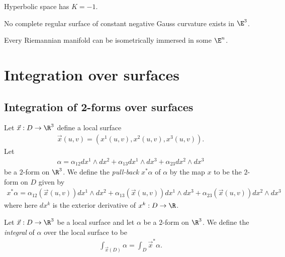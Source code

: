 \documentclass{article}
\begin{document}
\begin{theorem}
    Hyperbolic space has $K=-1$.    
\end{theorem}

\begin{theorem}[Hilbert]
    No complete regular surface of constant negative Gauss curvature exists in $\E^3$. 
\end{theorem}

\begin{theorem}[Nash]
    Every Riemannian manifold can be isometrically immersed in some $\E^n$. 
\end{theorem}

\section{Integration over surfaces}

\subsection{Integration of 2-forms over surfaces}

\begin{definition}
    Let $\vec x:D\to\R^3$ define a local surface 
    \begin{align*}
        \vec x(u,v)=(x^1(u,v), x^2(u,v), x^3(u,v)).
    \end{align*}
    Let 
    \begin{align*}
        \alpha = \alpha_{12}dx^1\wedge dx^2 + \alpha_{13}dx^1\wedge dx^3 + \alpha_{23}dx^2\wedge dx^3
    \end{align*}
    be a $2$-form on $\R^3$. We define the \emph{pull-back} $x^*\alpha$ of $\alpha$ by the map $x$
    to be the $2$-form on $D$ given by 
    \begin{align*}
        x^*\alpha = \alpha_{12}(\vec x(u,v))dx^1\wedge dx^2+ \alpha_{13}(\vec x(u,v))dx^1\wedge dx^3 + \alpha_{23}(\vec x(u,v))dx^2\wedge dx^3
    \end{align*}
    where here $dx^k$ is the exterior derivative of $x^k:D\to\R$.
\end{definition}

\begin{definition}
    Let $\vec x:D\to\R^3$ be a local surface and let $\alpha$ be a $2$-form on $\R^3$. We define 
    the \emph{integral} of $\alpha$ over the local surface to be 
    \begin{align*}
        \int_{\vec x(D)} \alpha = \int_D \vec x^*\alpha.
    \end{align*}
\end{definition}
\end{document}
